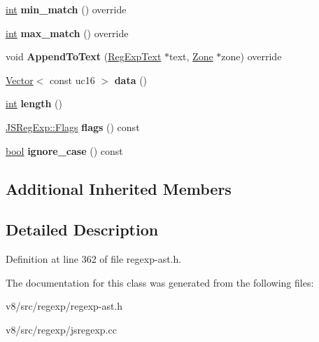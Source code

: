 \begin{DoxyCompactItemize}
\mbox{\hyperlink{classint}{int}} {\bfseries min\+\_\+match} () override
\item 
\mbox{\label{classv8_1_1internal_1_1RegExpAtom_ac030610f58e9dd3b4f26dbf6c4f599d7}} 
\mbox{\hyperlink{classint}{int}} {\bfseries max\+\_\+match} () override
\item 
\mbox{\label{classv8_1_1internal_1_1RegExpAtom_a7f46566fde6671d6e646caa80984e421}} 
void {\bfseries Append\+To\+Text} (\mbox{\hyperlink{classv8_1_1internal_1_1RegExpText}{Reg\+Exp\+Text}} $\ast$text, \mbox{\hyperlink{classv8_1_1internal_1_1Zone}{Zone}} $\ast$zone) override
\item 
\mbox{\label{classv8_1_1internal_1_1RegExpAtom_ad5711a0a79d8952864b2d6fd61ab66c6}} 
\mbox{\hyperlink{classv8_1_1internal_1_1Vector}{Vector}}$<$ const uc16 $>$ {\bfseries data} ()
\item 
\mbox{\label{classv8_1_1internal_1_1RegExpAtom_a315e0291cf6e0b1487dfa2fe00dda91f}} 
\mbox{\hyperlink{classint}{int}} {\bfseries length} ()
\item 
\mbox{\label{classv8_1_1internal_1_1RegExpAtom_a8d52b43aaf15113b38df6257aee5c426}} 
\mbox{\hyperlink{classv8_1_1base_1_1Flags}{J\+S\+Reg\+Exp\+::\+Flags}} {\bfseries flags} () const
\item 
\mbox{\label{classv8_1_1internal_1_1RegExpAtom_a816bc1fb1cb6c63930fac01d9819dbe1}} 
\mbox{\hyperlink{classbool}{bool}} {\bfseries ignore\+\_\+case} () const
\end{DoxyCompactItemize}
\subsection*{Additional Inherited Members}


\subsection{Detailed Description}


Definition at line 362 of file regexp-\/ast.\+h.



The documentation for this class was generated from the following files\+:\begin{DoxyCompactItemize}
\item 
v8/src/regexp/regexp-\/ast.\+h\item 
v8/src/regexp/jsregexp.\+cc\end{DoxyCompactItemize}
